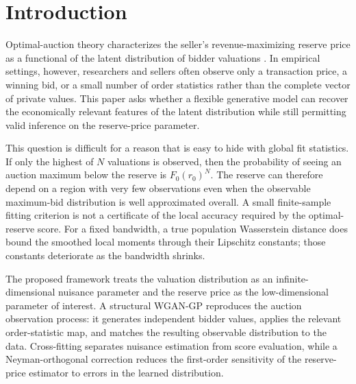 \section{Introduction}

Optimal-auction theory characterizes the seller's revenue-maximizing reserve
price as a functional of the latent distribution of bidder valuations
\citep{myerson1981}. In empirical settings, however, researchers and sellers
often observe only a transaction price, a winning bid, or a small number of
order statistics rather than the complete vector of private values. This paper
asks whether a flexible generative model can recover the economically relevant
features of the latent distribution while still permitting valid inference on
the reserve-price parameter.

This question is difficult for a reason that is easy to hide with global fit
statistics. If only the highest of $N$ valuations is observed, then the
probability of seeing an auction maximum below the reserve is $F_0(r_0)^N$.
The reserve can therefore depend on a region with very few observations even
when the observable maximum-bid distribution is well approximated overall.
A small finite-sample fitting criterion is not a certificate of the local
accuracy required by the optimal-reserve score. For a fixed bandwidth, a true
population Wasserstein distance does bound the smoothed local moments through
their Lipschitz constants; those constants deteriorate as the bandwidth shrinks.

The proposed framework treats the valuation distribution as an
infinite-dimensional nuisance parameter and the reserve price as the
low-dimensional parameter of interest. A structural WGAN-GP reproduces the
auction observation process: it generates independent bidder values, applies
the relevant order-statistic map, and matches the resulting observable
distribution to the data. Cross-fitting separates nuisance estimation from
score evaluation, while a Neyman-orthogonal correction reduces the first-order
sensitivity of the reserve-price estimator to errors in the learned
distribution.

